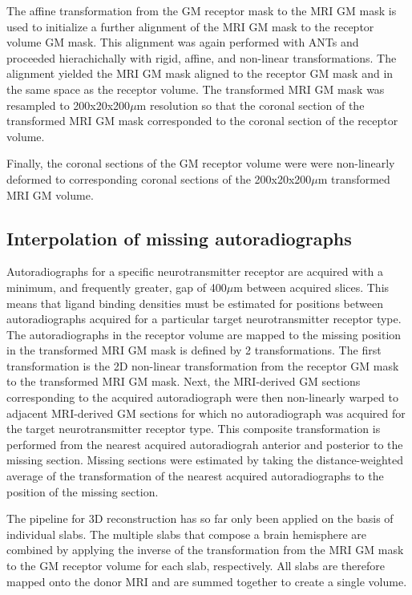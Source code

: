 \documentclass[12pt]{article}
\begin{document}
    The affine transformation from the GM receptor mask to the MRI GM mask is used to initialize a further alignment of the MRI GM mask to the receptor volume GM mask. This alignment was again performed with ANTs and proceeded hierachichally with rigid, affine, and non-linear transformations. The alignment yielded the MRI GM mask aligned to the receptor GM mask and in the same space as the receptor volume. The transformed MRI GM mask was resampled to 200x20x200$\mu$m resolution so that the coronal section of the transformed MRI GM mask corresponded to the coronal section of the receptor volume. 
    
    Finally, the coronal sections of the GM receptor volume were were non-linearly deformed to corresponding coronal sections of the 200x20x200$\mu$m transformed MRI GM volume.
    
\subsection{Interpolation of missing autoradiographs}

Autoradiographs for a specific neurotransmitter receptor are acquired with a minimum, and frequently greater, gap of 400$\mu$m between acquired slices. This means that ligand binding densities must be estimated for positions between autoradiographs acquired for a particular target neurotransmitter receptor type. The autoradiographs in the receptor volume are mapped to the missing position in the transformed MRI GM mask is defined by 2 transformations. The first transformation is the 2D non-linear transformation from the receptor GM mask to the transformed MRI GM mask. Next, the MRI-derived GM sections corresponding to the acquired autoradiograph were then non-linearly warped to adjacent MRI-derived GM sections for which no autoradiograph was acquired for the target neurotransmitter receptor type. This composite transformation is performed from the nearest acquired autoradiograh anterior and posterior to the missing section. Missing sections were estimated by taking the distance-weighted average of the transformation of the nearest acquired autoradiographs to the position of the missing section. 

The pipeline for 3D reconstruction has so far only been applied on the basis of individual slabs. The multiple slabs that compose a brain hemisphere are combined by applying the inverse of the transformation from the MRI GM mask to the GM receptor volume for each slab, respectively. All slabs are therefore mapped onto the donor MRI and are summed together to create a single volume. 
\end{document}
